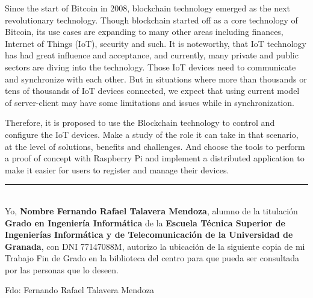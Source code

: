 
\vspace{0.7cm}

\vspace{5mm}

Since the start of Bitcoin in 2008, blockchain technology emerged as the next revolutionary technology. 
Though blockchain started off as a core technology of Bitcoin, its use cases are expanding to many other 
areas including finances, Internet of Things (IoT), security and such. It is noteworthy, that IoT technology 
has had great influence and acceptance, and currently, many private and public sectors are diving into the 
technology. Those IoT devices need to communicate and synchronize with each other. But in situations where 
more than thousands or tens of thousands of IoT devices connected, we expect that using current model of 
server-client may have some limitations and issues while in synchronization.

\vspace{5mm}

\noindent Therefore, it is proposed to use the Blockchain technology to control and configure the IoT devices. 
Make a study of the role it can take in that scenario, at the level of solutions, benefits and challenges. 
And choose the tools to perform a proof of concept with Raspberry Pi and implement a distributed application 
to make it easier for users to register and manage their devices.

\clearpage
\thispagestyle{empty}

\noindent\rule[-1ex]{\textwidth}{2pt}\\[4.5ex]

Yo, \textbf{Nombre Fernando Rafael Talavera Mendoza}, alumno de la titulación \textbf{Grado en Ingeniería Informática} 
de la \textbf{Escuela Técnica Superior de Ingenierías Informática y de Telecomunicación de la Universidad de Granada}, 
con DNI 77147088M, autorizo la ubicación de la siguiente copia de mi Trabajo Fin de Grado en la biblioteca del centro 
para que pueda ser consultada por las personas que lo deseen.

\vspace{6cm}

\noindent Fdo: Fernando Rafael Talavera Mendoza

\vspace{2cm}

